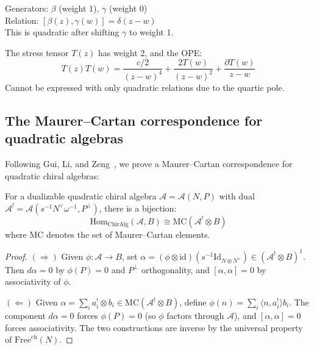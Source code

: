 \begin{example}
Generators: $\beta$ (weight 1), $\gamma$ (weight 0) \\
Relation: $[\beta(z), \gamma(w)] = \delta(z-w)$ \\
This is quadratic after shifting $\gamma$ to weight 1.
\end{example}

\begin{example}
The stress tensor $T(z)$ has weight 2, and the OPE:
\[
T(z)T(w) = \frac{c/2}{(z-w)^4} + \frac{2T(w)}{(z-w)^2} + \frac{\partial T(w)}{z-w}
\]
Cannot be expressed with only quadratic relations due to the quartic pole.
\end{example}

\subsection{The Maurer--Cartan correspondence for quadratic algebras}

Following Gui, Li, and Zeng~\cite{QuadDual}, we prove a Maurer--Cartan correspondence for quadratic chiral algebras:

\begin{theorem}
\label{thm:mc-quadratic}
For a dualizable quadratic chiral algebra $\mathcal{A} = \mathcal{A}(N, P)$ with dual $\mathcal{A}^! = \mathcal{A}(s^{-1}N^{\vee}\omega^{-1}, P^{\perp})$, there is a bijection:
\[
\text{Hom}_{\text{ChirAlg}}(\mathcal{A}, B) \cong \text{MC}(\mathcal{A}^! \otimes B)
\]
where $\text{MC}$ denotes the set of Maurer--Cartan elements.
\end{theorem}

\begin{proof}
\emph{$(\Rightarrow)$}\enspace
Given $\phi\colon \mathcal{A} \to B$, set
$\alpha = (\phi \otimes \mathrm{id})(s^{-1}\mathrm{Id}_{N \otimes N^\vee}) \in (\mathcal{A}^! \otimes B)^1$.
Then $d\alpha = 0$ by $\phi(P) = 0$ and $P^\perp$ orthogonality, and
$[\alpha,\alpha] = 0$ by associativity of $\phi$.

\emph{$(\Leftarrow)$}\enspace
Given $\alpha = \sum_i a_i^! \otimes b_i \in \mathrm{MC}(\mathcal{A}^! \otimes B)$,
define $\phi(n) = \sum_i \langle n, a_i^!\rangle b_i$.
The component $d\alpha = 0$ forces $\phi(P) = 0$ (so $\phi$ factors through $\mathcal{A}$),
and $[\alpha,\alpha] = 0$ forces associativity.
The two constructions are inverse by the universal property of $\mathrm{Free}^{\mathrm{ch}}(N)$. \qedhere
\end{proof}

